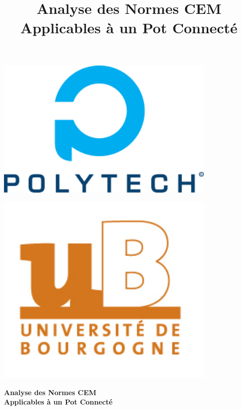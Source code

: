 \documentclass[a4paper,12pt]{article}
\title{Analyse des Normes CEM Applicables à un Pot Connecté}
\author{}
\date{}
\begin{document}
\begin{titlepage}
    \begin{center}
        \vspace*{2cm}
        \begin{minipage}{0.4\textwidth}
            \centering
            \includegraphics[width=0.8\textwidth]{imgs/polytech.png} %
        \end{minipage}
        \hspace{1cm}
        \begin{minipage}{0.4\textwidth}
            \centering
            \includegraphics[width=0.8\textwidth]{imgs/ub.jpg} %
        \end{minipage}

        \vspace{2cm}
        \Huge
        \textbf{Analyse des Normes CEM \\ Applicables à un Pot Connecté}


\end{center}
\end{titlepage}
\end{document}
